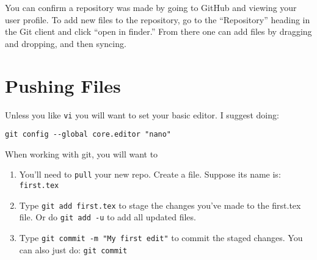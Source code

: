 \documentclass{ximera}
\begin{document}
You can confirm a repository was made by going to GitHub and viewing
your user profile. To add new files to the repository, go to the
``Repository'' heading in the Git client and click ``open in finder.''
From there one can add files by dragging and dropping, and then
syncing.


\section{Pushing Files}

Unless you like \verb|vi| you will want to set your basic editor. I
suggest doing:

\begin{verbatim}
git config --global core.editor "nano"
\end{verbatim}

When working with git, you will want to
  \begin{enumerate}
\item You'll need to \verb!pull! your new repo. Create a file. Suppose its name is:
  \verb|first.tex|
\item Type \verb!git add first.tex! to stage the changes you've made
  to the first.tex file. Or do \verb|git add -u| to add all updated
  files.
\item Type \verb!git commit -m "My first edit"! to commit the staged changes. You can also just do: \verb|git commit|
  \end{enumerate}
\end{document}
